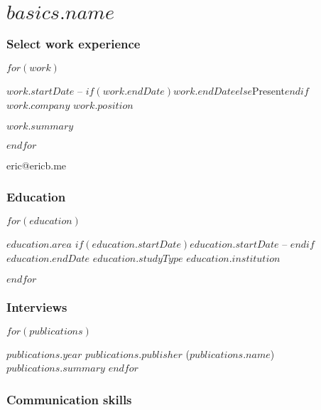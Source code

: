 \documentclass[fontsize=10pt]{tccv}
\begin{document}
\part{$basics.name$}

\section{Select work experience}

\begin{eventlist}
  $for(work)$
\item{$work.startDate$ -- $if(work.endDate)$$work.endDate$$else$Present$endif$}
  {$work.company$ \href{$work.website$}{\Large{}}}
  {$work.position$}

  $work.summary$

  $endfor$

\end{eventlist}

{eric@ericb.me}

\section{Education}

\begin{yearlist}

  $for(education)$
\item[$education.area$]{$if(education.startDate)$$education.startDate$ -- $endif$$education.endDate$}
  {$education.studyType$}
  {$education.institution$}

  $endfor$

\end{yearlist}

\section{Interviews}

\begin{yearlist}

  $for(publications)$
\item{$publications.year$}
  {$publications.publisher$ (\href{$publications.website$}{$publications.name$})}
  {$publications.summary$}
  $endfor$

\end{yearlist}

\section{Communication skills}
\end{document}

